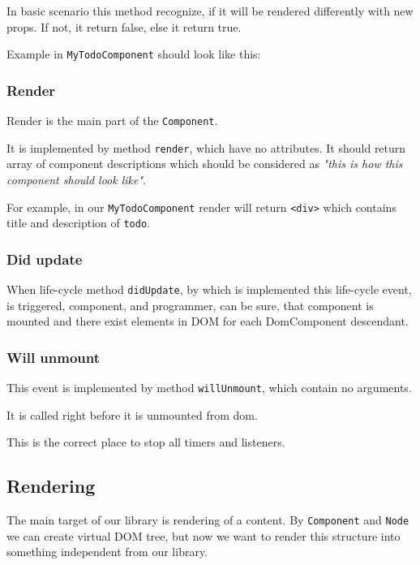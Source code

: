       In basic scenario this method recognize, 
      if it will be rendered differently with new props.  
      If not, it return false, else it return true.

      Example in \texttt{MyTodoComponent} should look like this:
      

    \subsubsection{Render}\label{subsec:our-architecture-lifecycle-render}

      Render is the main part of the \texttt{Component}. 

      It is implemented by method \texttt{render}, which have no attributes.
      It should return array of component descriptions which should be considered as 
      \textit{"this is how this component should look like"}.

      For example, in our \texttt{MyTodoComponent} render will return \texttt{<div>} which contains title and description of \texttt{todo}.
      

    \subsubsection{Did update}\label{subsec:our-architecture-lifecycle-didupdate}

      When life-cycle method \texttt{didUpdate}, 
      by which is implemented this life-cycle event, 
      is triggered, component, and programmer, can be sure, 
      that component is mounted and there exist elements in DOM for each DomComponent descendant.

    \subsubsection{Will unmount}\label{subsec:our-architecture-lifecycle-willunmount}

      This event is implemented by method \texttt{willUnmount}, which contain no arguments.
      
      It is called right before it is unmounted from dom. 

      This is the correct place to stop all timers and listeners.
      

  \subsection{Rendering}\label{subsec:our-architecture-rendering}
    The main target of our library is rendering of a content. 
    By \texttt{Component} and \texttt{Node} we can create virtual DOM tree, 
    but now we want to render this structure into something independent from our library. 


